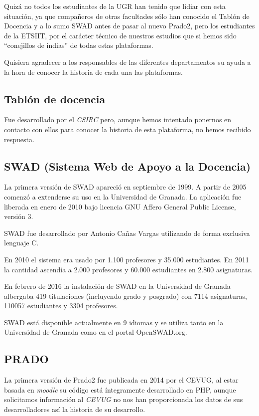 \bigskip
Quizá no todos los estudiantes de la UGR han tenido que lidiar con esta situación, ya que compañeros de otras facultades sólo han conocido el Tablón de Docencia y a lo sumo SWAD antes de pasar al nuevo Prado2, pero los estudiantes de la ETSIIT, por el carácter técnico de nuestros estudios que si hemos sido ``conejillos de indias'' de todas estas plataformas.

\bigskip
Quisiera agradecer a los responsables de las diferentes departamentos su ayuda a la hora de conocer la historia de cada una las plataformas.

\subsection{Tablón de docencia}

Fue desarrollado por el \textit{CSIRC} pero, aunque hemos intentado ponernos en contacto con ellos para conocer la historia de esta plataforma, no hemos recibido respuesta.

\subsection{SWAD (Sistema Web de Apoyo a la Docencia)}

La primera versión de SWAD apareció en septiembre de 1999. A partir de 2005 comenzó a extenderse su uso en la Universidad de Granada. La aplicación fue liberada en enero de 2010 bajo licencia GNU Affero General Public License, versión 3.

\bigskip
SWAD fue desarrollado por Antonio Cañas Vargas utilizando de forma exclusiva lenguaje C.

\bigskip
En 2010 el sistema era usado por 1.100 profesores y 35.000 estudiantes. En 2011 la cantidad ascendía a 2.000 profesores y 60.000 estudiantes en 2.800 asignaturas.

\bigskip
En febrero de 2016 la instalación de SWAD en la Universidad de Granada albergaba 419 titulaciones (incluyendo grado y posgrado) con 7114 asignaturas, 110057 estudiantes y 3304 profesores.

\bigskip
SWAD está disponible actualmente en 9 idiomas y se utiliza tanto en la Universidad de Granada como en el portal OpenSWAD.org.


\subsection{PRADO}

La primera versión de Prado2 fue publicada en 2014 por el CEVUG, al estar basada en \textit{moodle} su código está íntegramente desarrollado en PHP, aunque solicitamos información al \textit{CEVUG} no nos han proporcionada los datos de sus desarrolladores así la historia de su desarrollo.

